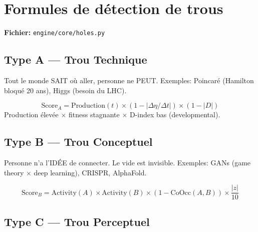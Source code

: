 \documentclass[11pt,a4paper]{article}
\begin{document}
\section{Formules de d\'etection de trous}

\textbf{Fichier:} \texttt{engine/core/holes.py}

\subsection{Type A --- Trou Technique}

Tout le monde SAIT o\`u aller, personne ne PEUT.
Exemples: Poincar\'e (Hamilton bloqu\'e 20 ans), Higgs (besoin du LHC).

\begin{equation}
\text{Score}_A = \text{Production}(t) \times (1 - |\Delta\eta / \Delta t|) \times (1 - |D|)
\end{equation}
Production \'elev\'ee $\times$ fitness stagnante $\times$ D-index bas (developmental).

\subsection{Type B --- Trou Conceptuel}

Personne n'a l'ID\'EE de connecter. Le vide est invisible.
Exemples: GANs (game theory $\times$ deep learning), CRISPR, AlphaFold.

\begin{equation}
\text{Score}_B = \text{Activity}(A) \times \text{Activity}(B) \times (1 - \text{CoOcc}(A,B)) \times \frac{|z|}{10}
\end{equation}

\subsection{Type C --- Trou Perceptuel}
\end{document}
